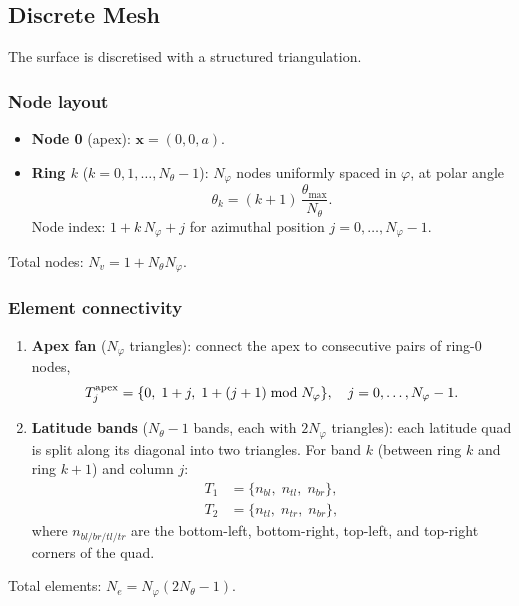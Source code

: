 \documentclass[11pt,a4paper]{article}
\newcommand{\bx}{\mathbf{x}}
\begin{document}
\subsection{Discrete Mesh}

The surface is discretised with a structured triangulation.

\subsubsection*{Node layout}

\begin{itemize}
  \item \textbf{Node 0} (apex): $\bx = (0, 0, a)$.
  \item \textbf{Ring $k$} ($k = 0, 1, \dots, N_\theta - 1$):
        $N_\varphi$ nodes uniformly spaced in $\varphi$, at polar angle
        \[
          \theta_k = (k+1)\,\frac{\theta_{\max}}{N_\theta}.
        \]
        Node index: $1 + k\,N_\varphi + j$ for azimuthal position
        $j = 0, \dots, N_\varphi - 1$.
\end{itemize}

Total nodes: $N_v = 1 + N_\theta N_\varphi$.

\subsubsection*{Element connectivity}

\begin{enumerate}
  \item \textbf{Apex fan} ($N_\varphi$ triangles): connect the apex to
        consecutive pairs of ring-0 nodes,
        \[
          T_j^{\rm apex} = \{0,\;1+j,\;1+(j+1)\bmod N_\varphi\},
          \quad j = 0,\dots,N_\varphi-1.
        \]
  \item \textbf{Latitude bands} ($N_\theta - 1$ bands, each with
        $2N_\varphi$ triangles): each latitude quad is split along its
        diagonal into two triangles.  For band $k$ (between ring $k$ and
        ring $k+1$) and column $j$:
        \begin{align*}
          T_1 &= \{n_{bl},\;n_{tl},\;n_{br}\}, \\
          T_2 &= \{n_{tl},\;n_{tr},\;n_{br}\},
        \end{align*}
        where $n_{bl/br/tl/tr}$ are the bottom-left, bottom-right, top-left,
        and top-right corners of the quad.
\end{enumerate}

Total elements: $N_e = N_\varphi(2N_\theta - 1)$.
\end{document}
